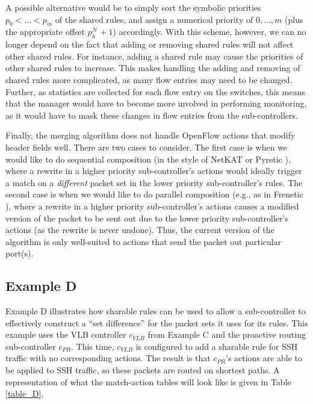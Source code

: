 \documentclass{article}
\begin{document}
A possible alternative would be to simply sort the symbolic priorities
$p_0 < \dots < p_m$ of the shared rules, and assign a numerical priority
of $0, \dots, m$ (plus the appropriate offset $p_h^{\mathcal{N}} + 1$) accordingly.
With this scheme, however, we can no longer depend on the fact that
adding or removing shared rules will not affect other shared rules.
For instance, adding a shared rule may cause the priorities of other
shared rules to increase. This makes handling the adding and removing
of shared rules more complicated, as many flow entries may need to be changed.
Further, as statistics are collected for each flow entry on the switches,
this means that the manager would have to become more involved in 
performing monitoring, as it would have to mask these changes in flow
entries from the sub-controllers.

Finally, the merging algorithm does not handle OpenFlow actions that modify 
header fields well. There are two cases to consider.
The first case is when we would like to do sequential composition (in the
style of NetKAT \cite{netkat} or Pyretic \cite{pyretic}), where a 
rewrite in a higher priority sub-controller's actions would ideally trigger
a match on a \emph{different} packet set in the lower priority sub-controller's
rules.
The second case is when we would like to do parallel composition (e.g., as in
Frenetic \cite{frenetic1}), where a rewrite in a higher priority 
sub-controller's actions causes a modified version of the packet to be sent out
due to the lower priority sub-controller's actions (as the rewrite is never 
undone).
Thus, the current version of the algorithm is only well-suited to actions
that send the packet out particular port(s).

\subsection{Example D} \label{Ex_D}

Example D illustrates how sharable rules can be used to allow a sub-controller
to effectively construct a ``set difference'' for the packet sets it uses
for its rules. 
This example uses the VLB controller $c_{VLB}$ from Example C
and the proactive routing sub-controller $c_{PR}$.
This time, $c_{VLB}$ is configured to add a sharable rule for SSH traffic with
no corresponding actions. The result is that $c_{PR}$'s actions are 
able to be applied to SSH traffic, so these packets are routed on shortest paths.
A representation of what the match-action tables will look like is given in 
Table \ref{table_D}.
\end{document}
